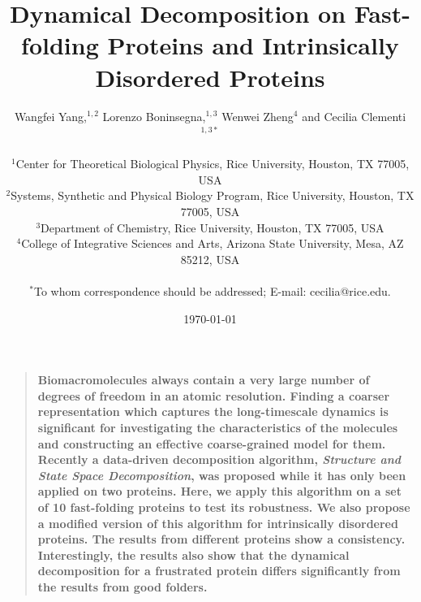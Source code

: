 \documentclass[12pt]{article}
\title{Dynamical Decomposition on Fast-folding Proteins and Intrinsically Disordered Proteins}
\author
{Wangfei Yang,$^{1,2}$ Lorenzo Boninsegna,$^{1,3}$ Wenwei Zheng$^{4}$ and Cecilia Clementi$^{1,3\ast}$\\
\\
\normalsize{$^{1}$Center for Theoretical Biological Physics, Rice University, Houston, TX 77005, USA}\\
\normalsize{$^{2}$Systems, Synthetic and Physical Biology Program, Rice University, Houston, TX 77005, USA}\\
\normalsize{$^{3}$Department of Chemistry, Rice University, Houston, TX 77005, USA}\\
\normalsize{$^{4}$College of Integrative Sciences and Arts, Arizona State University, Mesa, AZ 85212, USA}\\
\\
\normalsize{$^\ast$To whom correspondence should be addressed; E-mail:  cecilia@rice.edu.}
}
\date{\today}
\newenvironment{sciabstract}{%
\begin{quote} \bf}
{\end{quote}}
\begin{document}
 


\baselineskip24pt


\maketitle 




\begin{sciabstract}
  Biomacromolecules always contain a very large number of degrees of freedom in an atomic resolution. Finding a coarser representation which captures the long-timescale dynamics is significant for investigating the characteristics of the molecules and constructing an effective coarse-grained model for them. Recently a data-driven decomposition algorithm, {\it Structure and State Space Decomposition}, was proposed while it has only been applied on two proteins. Here, we apply this algorithm on a set of 10 fast-folding proteins to test its robustness. We also propose a modified version of this algorithm for intrinsically disordered proteins. The results from different proteins show a consistency. Interestingly, the results also show that the dynamical decomposition for a frustrated protein differs significantly from the results from good folders.
\end{sciabstract}

\end{document}
